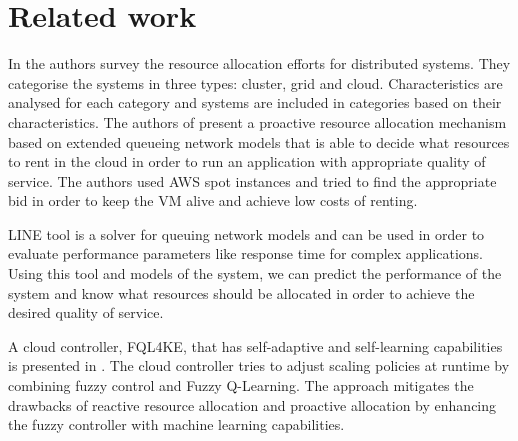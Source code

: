 \section{Related work}
\label{sec:relatedWork}

In \cite{Hussain2013} the authors survey the resource allocation efforts for distributed systems. They categorise the systems in three types: cluster, grid and cloud. Characteristics are analysed for each category and systems are included in categories based on their characteristics. The authors of \cite{Dubois} present a proactive resource allocation mechanism based on extended queueing network models that is able to decide what resources to rent in the cloud in order to run an application with appropriate quality of service. The authors used AWS spot instances and tried to find the appropriate bid in order to keep the VM alive and achieve low costs of renting.

LINE \cite{Perez2013} tool is a solver for queuing network models and can be used in order to evaluate performance parameters like response time for complex applications. Using this tool and models of the system, we can predict the performance of the system and know what resources should be allocated in order to achieve the desired quality of service.

A cloud controller, FQL4KE, that has self-adaptive and self-learning capabilities is presented in \cite{Jamshidi2015}. The cloud controller tries to adjust scaling policies at runtime by combining fuzzy control and Fuzzy Q-Learning. The approach mitigates the drawbacks of reactive resource allocation and proactive allocation by enhancing the fuzzy controller with machine learning capabilities.
